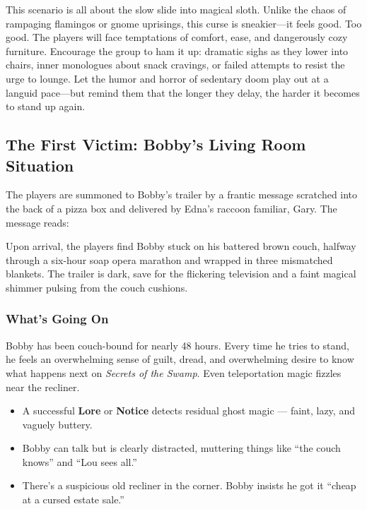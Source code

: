 This scenario is all about the slow slide into magical sloth. Unlike the chaos of rampaging flamingos or gnome uprisings, this curse is sneakier—it feels good. Too good. The players will face temptations of comfort, ease, and dangerously cozy furniture. Encourage the group to ham it up: dramatic sighs as they lower into chairs, inner monologues about snack cravings, or failed attempts to resist the urge to lounge. Let the humor and horror of sedentary doom play out at a languid pace—but remind them that the longer they delay, the harder it becomes to stand up again.

\subsection{The First Victim: Bobby’s Living Room Situation}

The players are summoned to Bobby’s trailer by a frantic message scratched into the back of a pizza box and delivered by Edna’s raccoon familiar, Gary. The message reads:

\begin{center}
\end{center}

Upon arrival, the players find Bobby stuck on his battered brown couch, halfway through a six-hour soap opera marathon and wrapped in three mismatched blankets. The trailer is dark, save for the flickering television and a faint magical shimmer pulsing from the couch cushions.

\subsubsection*{What’s Going On}
Bobby has been couch-bound for nearly 48 hours. Every time he tries to stand, he feels an overwhelming sense of guilt, dread, and overwhelming desire to know what happens next on \textit{Secrets of the Swamp}. Even teleportation magic fizzles near the recliner.

\begin{itemize}
    \item A successful \textbf{Lore} or \textbf{Notice}  detects residual ghost magic — faint, lazy, and vaguely buttery.
    \item Bobby can talk but is clearly distracted, muttering things like “the couch knows” and “Lou sees all.”
    \item There’s a suspicious old recliner in the corner. Bobby insists he got it “cheap at a cursed estate sale.”
\end{itemize}

